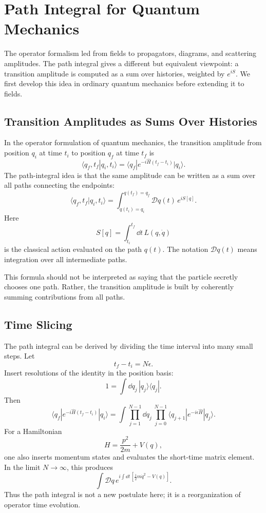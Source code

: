 \chapter{Path Integral for Quantum Mechanics}

\begin{remarkbox}
The operator formalism led from fields to propagators, diagrams, and scattering
amplitudes. The path integral gives a different but equivalent viewpoint: a
transition amplitude is computed as a sum over histories, weighted by
\(e^{iS}\). We first develop this idea in ordinary quantum mechanics before
extending it to fields.
\end{remarkbox}

\section{Transition Amplitudes as Sums Over Histories}

In the operator formulation of quantum mechanics, the transition amplitude from
position \(q_i\) at time \(t_i\) to position \(q_f\) at time \(t_f\) is
\[
    \langle q_f,t_f|q_i,t_i\rangle
    = \langle q_f|e^{-i\hat H(t_f-t_i)}|q_i\rangle.
\]
The path-integral idea is that the same amplitude can be written as a sum over
all paths connecting the endpoints:
\[
    \langle q_f,t_f|q_i,t_i\rangle
    = \int_{q(t_i)=q_i}^{q(t_f)=q_f}\mathcal{D}q(t)\,
      e^{iS[q]}.
\]
Here
\[
    S[q]=\int_{t_i}^{t_f}\dd t\,L(q,\dot q)
\]
is the classical action evaluated on the path \(q(t)\). The notation
\(\mathcal{D}q(t)\) means integration over all intermediate paths.

This formula should not be interpreted as saying that the particle secretly
chooses one path. Rather, the transition amplitude is built by coherently
summing contributions from all paths.

\section{Time Slicing}

The path integral can be derived by dividing the time interval into many small
steps. Let
\[
    t_f-t_i=N\epsilon.
\]
Insert resolutions of the identity in the position basis:
\[
    1=\int\dd q_j\,|q_j\rangle\langle q_j|.
\]
Then
\[
    \langle q_f|e^{-i\hat H(t_f-t_i)}|q_i\rangle
    = \int\prod_{j=1}^{N-1}\dd q_j\,
      \prod_{j=0}^{N-1}\langle q_{j+1}|e^{-i\epsilon\hat H}|q_j\rangle.
\]
For a Hamiltonian
\[
    H=\frac{p^2}{2m}+V(q),
\]
one also inserts momentum states and evaluates the short-time matrix element.
In the limit \(N\to\infty\), this produces
\[
    \int\mathcal{D}q\,e^{i\int\dd t\,[\frac{1}{2}m\dot q^2-V(q)]}.
\]
Thus the path integral is not a new postulate here; it is a reorganization of
operator time evolution.

